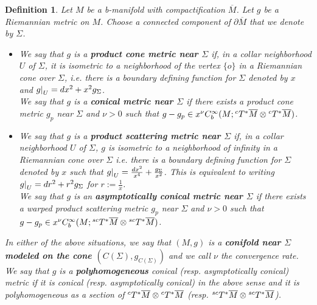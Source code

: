 \documentclass[a4paper,11pt]{article}
\newcounter{mythm}[section]
\newtheorem{defi}[mythm]{Definition}
\newcommand\restr[2]{{%
  \left.\kern-\nulldelimiterspace %
  #1 %
  \littletaller %
  \right|_{#2} %
  }}
\newcommand{\littletaller}{\mathchoice{\vphantom{\big|}}{}{}{}}
\begin{document}
\begin{defi} \label{def : conifolds}
Let $M$ be a b-manifold with compactification $\overline{M}$. Let $g$ be a Riemannian metric on $M$. Choose a connected component of $\partial \overline{M}$ that we denote by $\Sigma$.
\begin{itemize}
\item 
We say that $g$ is a \textbf{product cone metric near $\Sigma$} if, in a collar neighborhood $U$ of $\Sigma$, it is isometric to a neighborhood of the vertex $\{ o\}$ in a Riemannian cone over $\Sigma$, i.e. there is a boundary defining function for $\Sigma$ denoted by $x$ and $\restr{g}{U} = dx^2 + x^2 g_{\Sigma}$.\\ 
We say that $g$ is a \textbf{conical metric near $\Sigma$} if there exists a product cone metric $g_p$ near $\Sigma$  and $\nu >0$ such that $g - g_p \in x^{\nu} C^{\infty}_b(M; \hspace{0.01cm} ^{c} T^{*} \overline{M} \otimes \hspace{0.01cm} ^{c} T^{*} \overline{M})$.


\item We say that $g$ is a \textbf{product scattering metric near $\Sigma$} if, in a collar neighborhood $U$ of $\Sigma$, $g$ is isometric to a neighborhood of infinity in a Riemannian cone over $\Sigma$ i.e. there is a boundary defining function for $\Sigma$ denoted by $x$ such that $\restr{g}{U} = \frac{dx^2}{x^4} + \frac{g_{\Sigma}}{x^2}$. This is equivalent to writing $\restr{g}{U} = dr^2 + r^2 g_{\Sigma}$ for $r:= \frac{1}{x}$.\\
We say that $g$ is an \textbf{asymptotically conical metric near $\Sigma$} if there exists a warped product scattering metric $ g_p$ near $\Sigma$ and $\nu >0$ such that $g - g_p \in x^{\nu} C^{\infty}_b(M; \hspace{0.01cm} ^{sc} T^{*} \overline{M} \otimes \hspace{0.01cm} ^{sc} T^{*} \overline{M}) $. 
\end{itemize}
In either of the above situations, we say that $(M,g)$ is a \textbf{conifold near $\Sigma$ modeled on the cone $\left(C(\Sigma), g_{C(\Sigma)}\right)$} and we call $\nu$ the convergence rate.\\
We say that $g$ is a \textbf{polyhomogeneous} conical (resp. asymptotically conical) metric if it is conical (resp. asymptotically conical) in the above sense and it is polyhomogeneous as a section of $^{c} T^{*} \overline{M} \otimes \hspace{0.01cm} ^{c} T^{*} \overline{M}$ (resp. $^{sc} T^{*} \overline{M} \otimes \hspace{0.01cm} ^{sc} T^{*} \overline{M}$).  
\end{defi} 
\end{document}
